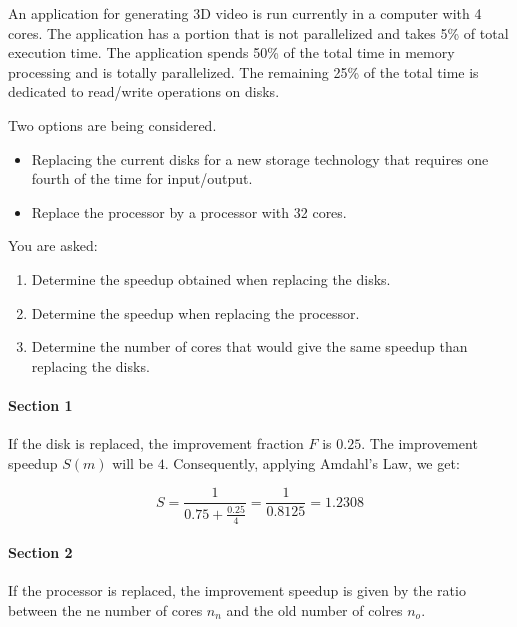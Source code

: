 \begin{acexercise}\end{acexercise}

An application for generating 3D video is run currently in a computer with 4
cores. The application has a portion that is not parallelized and takes 5\% of
total execution time. The application spends 50\% of the total time in memory
processing and is totally parallelized. The remaining 25\% of the total time is
dedicated to read/write operations on disks.

Two options are being considered.

\begin{itemize}
\item Replacing the current disks for a new storage technology that requires one fourth of the time for input/output.
\item Replace the processor by a processor with 32 cores.
\end{itemize}

You are asked:

\begin{enumerate}
\item Determine the speedup obtained when replacing the disks.
\item Determine the speedup when replacing the processor.
\item Determine the number of cores that would give the same speedup than replacing the disks.
\end{enumerate}


\begin{acsolution}\end{acsolution}

\paragraph{Section 1}
If the disk is replaced, the improvement fraction $F$ is $0.25$.
The improvement speedup $S(m)$ will be $4$.
Consequently, applying Amdahl's Law, we get:

\[
S = \frac{1}{0.75 + \frac{0.25}{4}} = \frac{1}{0.8125} =  1.2308
\]

\paragraph{Section 2}
If the processor is replaced, the improvement speedup is given by the ratio
between the ne number of cores $n_n$ and the old number of colres $n_o$.

